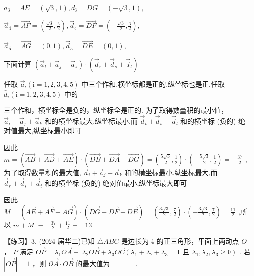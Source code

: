 \documentclass[10pt]{article}
\begin{document}
\(\overline{{a}_{3}} = \overline{AE} = \left( {\sqrt{3},1}\right) ,\overline{{d}_{3}} = \overline{DG} = \left( {-\sqrt{3},1}\right) ,\)

\({\overrightarrow{a}}_{4} = \overrightarrow{AF} = \left( {\frac{\sqrt{3}}{2},\frac{3}{2}}\right) ,{\overrightarrow{d}}_{4} = \overrightarrow{DF} = \left( {-\frac{\sqrt{3}}{2},\frac{3}{2}}\right) ,\)

\({\overrightarrow{a}}_{5} = \overrightarrow{AG} = \left( {0,1}\right) ,{\overrightarrow{d}}_{5} = \overrightarrow{DE} = \left( {0,1}\right) ,\)

下面计算 \(\left( {{\overrightarrow{a}}_{l} + {\overrightarrow{a}}_{j} + {\overrightarrow{a}}_{k}}\right)  \cdot  \left( {{\overrightarrow{d}}_{r} + {\overrightarrow{d}}_{s} + {\overrightarrow{d}}_{t}}\right)\)

任取 \({\overrightarrow{a}}_{i}\left( {\mathrm{i} = 1,2,3,4,5}\right)\) 中三个作和,横坐标都是正的,纵坐标也是正,任取 \({\bar{d}}_{i}\left( {\mathrm{i} = 1,2,3,4,5}\right)\) 中的

三个作和，横坐标全是负的，纵坐标全是正的. 为了取得数量积的最小值， \({\overrightarrow{a}}_{i} + {\overrightarrow{a}}_{j} + {\overrightarrow{a}}_{k}\) 和的横坐标最大,纵坐标最小,而 \({\overrightarrow{d}}_{t} + {\overrightarrow{d}}_{s} + {\overrightarrow{d}}_{t}\) 和的横坐标 (负的) 绝对值最大,纵坐标最小即可

因此 \(m = \left( {\overrightarrow{AB} + \overrightarrow{AD} + \overrightarrow{AE}}\right)  \cdot  \left( {\overrightarrow{DB} + \overrightarrow{DA} + \overrightarrow{DG}}\right)  = \left( {\frac{5\sqrt{3}}{2},\frac{1}{2}}\right)  \cdot  \left( {-\frac{5\sqrt{3}}{2},\frac{1}{2}}\right)  =  - \frac{37}{2}\) ,为了取得数量积的最大值, \({\overrightarrow{a}}_{i} + {\overrightarrow{a}}_{j} + {\overrightarrow{a}}_{k}\) 和的横坐标最小,纵坐标最大,而 \({\overrightarrow{d}}_{r} + {\overrightarrow{d}}_{s} + {\overrightarrow{d}}_{t}\) 和的横坐标 (负的) 绝对值最小,纵坐标最大即可

因此 \(M = \left( {\overrightarrow{AE} + \overrightarrow{AF} + \overrightarrow{AG}}\right)  \cdot  \left( {\overrightarrow{DG} + \overrightarrow{DF} + \overrightarrow{DE}}\right)  = \left( {\frac{3\sqrt{3}}{2},\frac{7}{2}}\right)  \cdot  \left( {-\frac{3\sqrt{3}}{2},\frac{7}{2}}\right)  = \frac{11}{2}\) ,所以 \(m + M \; =  - \frac{37}{2} + \frac{11}{2} =  - {13}\)

【练习】3. (2024 届华二)已知 \(\bigtriangleup  {ABC}\) 是边长为 4 的正三角形，平面上两动点 \(O\) ， \(P\) 满足 \(\overrightarrow{OP} = {\lambda }_{1}\overrightarrow{OA} + \; {\lambda }_{2}\overrightarrow{OB} + {\lambda }_{3}\overrightarrow{OC}\left( {{\lambda }_{1} + {\lambda }_{2} + {\lambda }_{3} = 1\text{ 且 }{\lambda }_{1},{\lambda }_{2},{\lambda }_{3} \geq  0}\right)\) . 若 \(\left| \overrightarrow{OP}\right|  = 1\) ，则 \(\overrightarrow{OA} \cdot  \overrightarrow{OB}\) 的最大值为\_\_\_\_\_.
\end{document}
